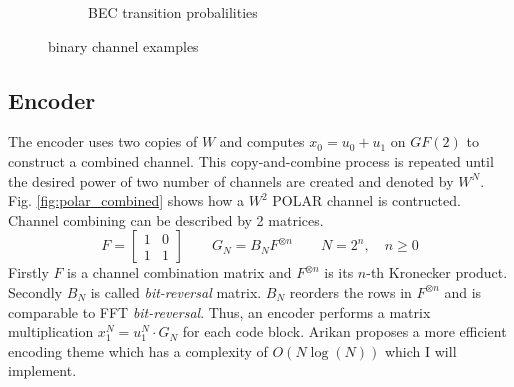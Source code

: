 \documentclass[a4paper,12pt]{scrartcl}
\begin{document}
\begin{figure}[!htb]
\begin{subfigure}{.3\textwidth}
  \caption{\ac{BEC} transition probalilities}
  \label{fig:bec}
 \end{subfigure}%

\caption{binary channel examples}
\label{fig:channel_examples}
\end{figure}

\subsection{Encoder}
The encoder uses two copies of $W$ and computes $x_0 = u_0 + u_1$ on $GF(2)$ to construct a combined channel.
This copy-and-combine process is repeated until the desired power of two number of channels are created and denoted by $W^N$.
Fig. \ref{fig:polar_combined} shows how a $W^2$ POLAR channel is contructed.
Channel combining can be described by 2 matrices.
\begin{equation}
  F = \begin{bmatrix}
 1 & 0 \\
 1 & 1
 \end{bmatrix}\quad\quad
 G_N = B_N F^{\otimes n}\quad\quad
 N = 2^n, \quad n \geq 0
\end{equation}
Firstly $F$ is a channel combination matrix and $F^{\otimes n}$ is its $n$-th Kronecker product.
Secondly $B_N$ is called \textit{bit-reversal} matrix.
$B_N$ reorders the rows in $F^{\otimes n}$ and is comparable to FFT \textit{bit-reversal}.
Thus, an encoder performs a matrix multiplication $x_1^N = u_1^N \cdot G_N $ for each code block.
Arikan proposes a more efficient encoding theme which has a complexity of $O(N \log(N))$ \cite{polar:arikan09} which I will implement.
\end{document}
